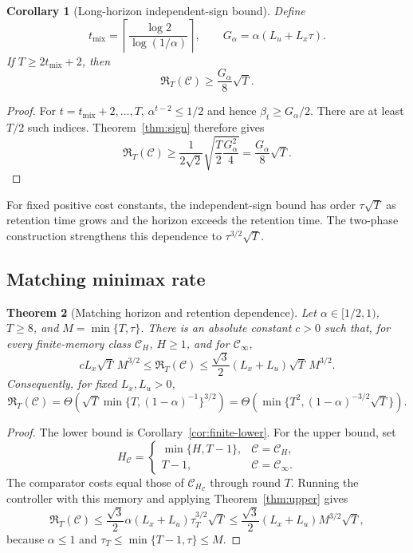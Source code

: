 \documentclass[11pt]{article}
\newtheorem{theorem}{Theorem}[section]
\newtheorem{corollary}[theorem]{Corollary}
\newcommand{\CH}{\mathcal C_H}
\newcommand{\CI}{\mathcal C_\infty}
\begin{document}
\begin{corollary}[Long-horizon independent-sign bound]
\label{cor:sign-long}
Define
\[
t_{\mathrm{mix}}
=
\left\lceil\frac{\log2}{\log(1/\alpha)}\right\rceil,
\qquad
G_\alpha=\alpha(L_u+L_x\tau).
\]
If $T\ge2t_{\mathrm{mix}}+2$, then
\[
\mathfrak R_T(\mathcal C)\ge\frac{G_\alpha}{8}\sqrt T.
\]
\end{corollary}

\begin{proof}
For $t=t_{\mathrm{mix}}+2,\ldots,T$,
$\alpha^{t-2}\le1/2$ and hence $\beta_t\ge G_\alpha/2$.
There are at least $T/2$ such indices.
Theorem~\ref{thm:sign} therefore gives
\[
\mathfrak R_T(\mathcal C)
\ge
\frac1{2\sqrt2}
\sqrt{\frac T2\frac{G_\alpha^2}{4}}
=
\frac{G_\alpha}{8}\sqrt T.
\]
\end{proof}

For fixed positive cost constants, the independent-sign bound
has order $\tau\sqrt T$ as retention time grows and the horizon
exceeds the retention time.
The two-phase construction strengthens this dependence to
$\tau^{3/2}\sqrt T$.

\subsection{Matching minimax rate}

\begin{theorem}[Matching horizon and retention dependence]
\label{thm:minimax}
Let $\alpha\in[1/2,1)$, $T\ge8$, and $M=\min\{T,\tau\}$.
There is an absolute constant $c>0$ such that, for every
finite-memory class $\CH$, $H\ge1$, and for $\CI$,
\begin{equation}
\label{eq:matching}
cL_x\sqrt T\,M^{3/2}
\le
\mathfrak R_T(\mathcal C)
\le
\frac{\sqrt3}{2}(L_x+L_u)\sqrt T\,M^{3/2}.
\end{equation}
Consequently, for fixed $L_x,L_u>0$,
\begin{equation}
\label{eq:rate}
\mathfrak R_T(\mathcal C)
=
\Theta\!\left(
\sqrt T\min\{T,(1-\alpha)^{-1}\}^{3/2}
\right)
=
\Theta\!\left(
\min\{T^2,(1-\alpha)^{-3/2}\sqrt T\}
\right).
\end{equation}
\end{theorem}

\begin{proof}
The lower bound is Corollary~\ref{cor:finite-lower}.
For the upper bound, set
\[
H_{\mathcal C}
=
\begin{cases}
\min\{H,T-1\},&\mathcal C=\CH,\\
T-1,&\mathcal C=\CI.
\end{cases}
\]
The comparator costs equal those of
$\mathcal C_{H_{\mathcal C}}$ through round $T$.
Running the controller with this memory and applying
Theorem~\ref{thm:upper} gives
\[
\mathfrak R_T(\mathcal C)
\le
\frac{\sqrt3}{2}\alpha(L_x+L_u)\tau_T^{3/2}\sqrt T
\le
\frac{\sqrt3}{2}(L_x+L_u)M^{3/2}\sqrt T,
\]
because $\alpha\le1$ and
$\tau_T\le\min\{T-1,\tau\}\le M$.
\end{proof}
\end{document}
